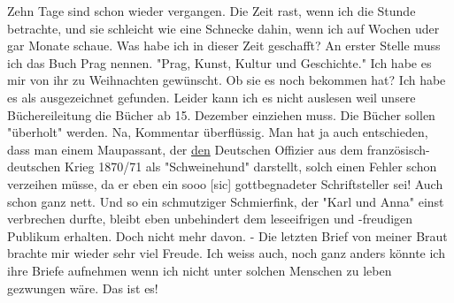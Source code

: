 \def\day{13. Dezember 1942}
\mktitle

Zehn Tage sind schon wieder vergangen.
Die Zeit rast, wenn ich die Stunde betrachte, und sie schleicht wie eine Schnecke dahin, wenn ich auf Wochen uder gar Monate schaue.
Was habe ich in dieser Zeit geschafft?
An erster Stelle muss ich das Buch Prag nennen.
"Prag, Kunst, Kultur und Geschichte."
Ich habe es mir von ihr zu Weihnachten gew\"{u}nscht.
Ob sie es noch bekommen hat?
Ich habe es als ausgezeichnet gefunden.
Leider kann ich es nicht auslesen weil unsere B\"{u}chereileitung die B\"{u}cher ab 15. Dezember einziehen muss.
Die B\"{u}cher sollen "\"{u}berholt" werden.
Na, Kommentar \"{u}berfl\"{u}ssig.
Man hat ja auch entschieden, dass man einem Maupassant, der \ul{den} Deutschen Offizier aus dem franz\"{o}sisch-deutschen Krieg 1870/71 als "Schweinehund" darstellt, solch einen Fehler schon verzeihen m\"{u}sse, da er eben ein sooo{\color{red} [sic] } gottbegnadeter Schriftsteller sei!
Auch schon ganz nett.
Und so ein schmutziger Schmierfink, der "Karl und Anna" einst verbrechen durfte, bleibt eben unbehindert dem leseeifrigen und -freudigen Publikum erhalten.
Doch nicht mehr davon.
- Die letzten Brief von meiner Braut brachte mir wieder sehr viel Freude.
Ich weiss auch, noch ganz anders k\"{o}nnte ich ihre Briefe aufnehmen wenn ich nicht unter solchen Menschen zu leben gezwungen w\"{a}re.
Das ist es!

\clearpage
